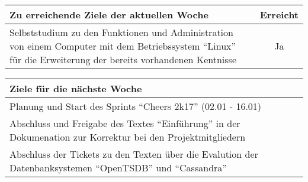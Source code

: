\begin{tabularx}{\textwidth}{Xc}
    \arrayrulecolor{OliveGreen}
    \toprule
    {\bfseries Zu erreichende Ziele der aktuellen Woche} & {\bfseries Erreicht} \\
    \midrule[2pt]
    Selbststudium zu den Funktionen und Administration von einem Computer
    mit dem Betriebssystem ``Linux'' für die Erweiterung der bereits vorhandenen
    Kentnisse  &  Ja  \\
    \bottomrule[2pt]
\end{tabularx}
%
\vspace{1cm}
%
\begin{tabularx}{\textwidth}{Xc}
    \arrayrulecolor{OliveGreen}
    \toprule
    {\bfseries Ziele für die nächste Woche}              &                      \\
    \midrule[2pt]
    Planung und Start des Sprints ``Cheers 2k17'' (02.01 - 16.01)  &  \\
    \rowcolor{OliveGreen!15}
    Abschluss und Freigabe des Textes ``Einführung'' in der
    Dokumenation zur Korrektur bei den Projektmitgliedern  &  \\
    \rowcolor{White}
    Abschluss der Tickets zu den Texten über die Evalution der
    Datenbanksystemen ``OpenTSDB'' und ``Cassandra''  &  \\
\end{tabularx}
